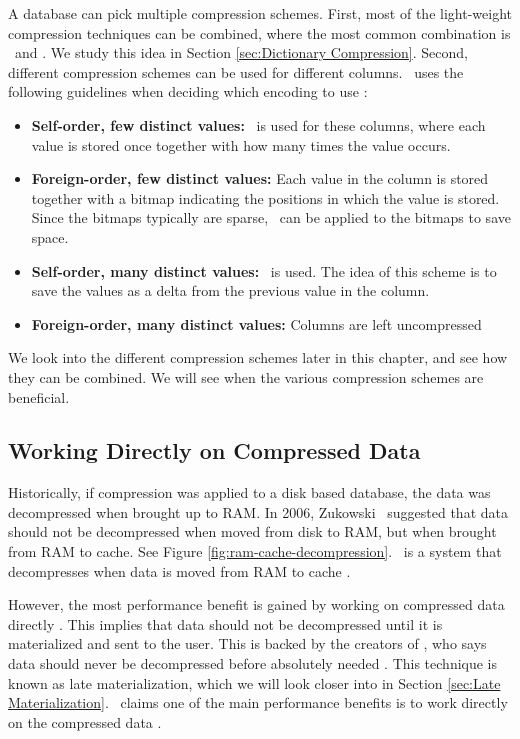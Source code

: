 A database can pick multiple compression schemes. First, most of the light-weight compression techniques can be combined, where the most common combination is \de~and \bp. We study this idea in Section \ref{sec:Dictionary Compression}. Second, different compression schemes can be used for different columns. \cstore~uses the following guidelines when deciding which encoding to use \cite{Stonebraker2005-qz}: 
\begin{itemize}
  \item \textbf{Self-order, few distinct values:} \rle~is used for these columns, where each value is stored once together with how many times the value occurs.
  \item \textbf{Foreign-order, few distinct values:} Each value in the column is stored together with a bitmap indicating the positions in which the value is stored. Since the bitmaps typically are sparse, \rle~can be applied to the bitmaps to save space.
  \item \textbf{Self-order, many distinct values:} \dele~is used. The idea of this scheme is to save the values as a delta from the previous value in the column.
  \item \textbf{Foreign-order, many distinct values:} Columns are left uncompressed
\end{itemize}

We look into the different compression schemes later in this chapter, and see how they can be combined. We will see when the various compression schemes are beneficial.

\subsection{Working Directly on Compressed Data}
\label{sub:Working Directly on Compressed Data}

Historically, if compression was applied to a disk based database, the data was decompressed when brought up to RAM. In 2006, Zukowski \ea~suggested that data should not be decompressed when moved from disk to RAM, but when brought from RAM to cache. See Figure \ref{fig:ram-cache-decompression}. \monetx~is a system that decompresses when data is moved from RAM to cache \cite{Johnson2008-cp}.

However, the most performance benefit is gained by working on compressed data directly \cite{Lemke2010-is}. This implies that data should not be decompressed until it is materialized and sent to the user. This is backed by the creators of \blink, who says data should never be decompressed before absolutely needed \cite{Barber2012-xt}. This technique is known as late materialization, which we will look closer into in Section \ref{sec:Late Materialization}. \oracle~claims one of the main performance benefits is to work directly on the compressed data \cite{Oracle2015-fs}.


